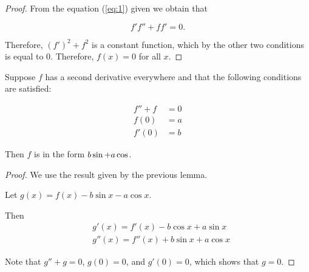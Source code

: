 \documentclass[11pt]{scrartcl}
\begin{document}
\begin{proof}
  From the equation (\ref{eq:1}) given we obtain that
  
  \begin{equation*}
    f'f''+ff'=0.
  \end{equation*}

  Therefore, $(f')^2+f^2$ is a constant function, which by the other
  two conditions is equal to 0. Therefore, $f(x) = 0$ for all $x$.

\end{proof}

\begin{lemma}
  \label{sec:1}
  Suppose $f$ has a second derivative everywhere and that the following conditions are satisfied:

  \begin{align}
    \label{eq:2}
    f''   + f & = 0 \\
    f(0)      & = a \\
    f'(0)     & = b
  \end{align}

  Then $f$ is in the form $b\*\sin  + a \* \cos$.
\end{lemma}

\begin{proof}

  We use the result given by the previous lemma.
  
  Let $g(x) = f(x) - b \sin x - a \cos x$.

  Then
  \begin{align}
    & g'(x) = f'(x) - b\cos x + a \sin x\\
    & g''(x) = f''(x) + b\sin x + a \cos x
  \end{align}

  Note that $g''+g = 0$, $g(0)= 0$, and $g'(0) = 0$,
  which shows that $g = 0$.
\end{proof}
\end{document}
